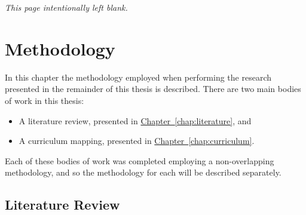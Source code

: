 \documentclass[twoside,12pt,a4paper]{report}
\makeatletter
\newcommand*{\intentionallyblankpage}{
  \vspace*{\fill}
  {\centering \textit{This page intentionally left blank.} \par}
  \vspace{\fill}}
\renewcommand*{\cleardoublepage}{\clearpage\if@twoside \ifodd\c@page\else
  \intentionallyblankpage
  \newpage
  \if@twocolumn\hbox{}\newpage\fi\fi\fi}
\newcommand{\refchap}[1]{\hyperref[chap:#1]{Chapter~\ref{chap:#1}}}
\makeatother
\begin{document}
\cleardoublepage
\chapter{Methodology}
\label{chap:methodology}

In this chapter the methodology employed when performing the research presented in the remainder of this thesis is described. There are two main bodies of work in this thesis:
\begin{itemize}
	\item A literature review, presented in \refchap{literature}, and 
	\item A curriculum mapping, presented in \refchap{curriculum}.
\end{itemize}
Each of these bodies of work was completed employing a non-overlapping methodology, and so the methodology for each will be described separately.

\section{Literature Review}
\end{document}
